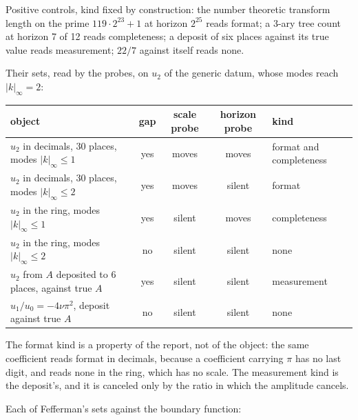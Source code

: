 Positive controls, kind fixed by construction: the number theoretic transform length on the prime
$119\cdot2^{23}+1$ at horizon $2^{25}$ reads format; a 3-ary tree count at horizon 7 of 12 reads
completeness; a deposit of six places against its true value reads measurement; $22/7$ against itself
reads none.

Their sets, read by the probes, on $u_2$ of the generic datum, whose modes reach $|k|_\infty = 2$:

\begin{center}
\begin{tabular}{@{}p{}ccc p{}@{}}
\toprule
object & gap & scale probe & horizon probe & kind \\
\midrule
$u_2$ in decimals, 30 places, modes $|k|_\infty\le1$ & yes & moves & moves & format and completeness \\
$u_2$ in decimals, 30 places, modes $|k|_\infty\le2$ & yes & moves & silent & format \\
$u_2$ in the ring, modes $|k|_\infty\le1$ & yes & silent & moves & completeness \\
$u_2$ in the ring, modes $|k|_\infty\le2$ & no & silent & silent & none \\
$u_2$ from $A$ deposited to 6 places, against true $A$ & yes & silent & silent & measurement \\
$u_1/u_0 = -4\nu\pi^2$, deposit against true $A$ & no & silent & silent & none \\
\bottomrule
\end{tabular}
\end{center}

The format kind is a property of the report, not of the object: the same coefficient reads format in
decimals, because a coefficient carrying $\pi$ has no last digit, and reads none in the ring, which
has no scale. The measurement kind is the deposit's, and it is canceled only by the ratio in which
the amplitude cancels.

Each of Fefferman's sets against the boundary function:

